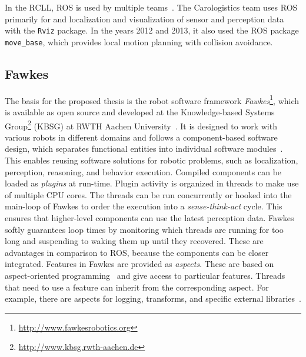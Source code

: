 In the RCLL, ROS is used by multiple teams~\cite{rc-2014}. The
Carologistics team uses ROS primarily for and localization and
visualization of sensor and perception data with the \texttt{Rviz}
package. In the years 2012 and 2013, it also used the ROS package
\texttt{move\_base}, which provides local motion planning with
collision avoidance.

\subsection{Fawkes}
\label{sec:fawkes}
The basis for the proposed thesis is the robot software framework
\emph{Fawkes}\footnote{\url{http://www.fawkesrobotics.org}}, which is
available as open source and developed at the Knowledge-based Systems
Group\footnote{\url{http://www.kbsg.rwth-aachen.de}} (KBSG) at RWTH
Aachen University~\cite{FawkesDesign,Fawkes-RCLL-2014}.  It is
designed to work with various robots in different domains and follows
a component-based software design, which separates functional entities
into individual software modules~\cite{component}. This enables
reusing software solutions for robotic problems, such as localization,
perception, reasoning, and behavior execution. Compiled components can
be loaded as \emph{plugins} at run-time.
%
Plugin activity is organized in threads to make use of multiple CPU
cores. The threads can be run concurrently or hooked into the
main-loop of Fawkes to order the execution into a
\emph{sense-think-act} cycle.  This ensures that higher-level
components can use the latest perception data.  Fawkes softly
guarantees loop times by monitoring which threads are running for too
long and suspending to waking them up until they recovered. These are advantages in comparison to ROS,
because the components can be closer integrated. Features in Fawkes
are provided as \emph{aspects}. These are based on aspect-oriented
programming~\cite{aspect_oriented} and give access to particular
features. Threads that need to use a feature can inherit from the
corresponding aspect. For example, there are aspects for logging,
transforms, and specific external libraries~\cite{tnthesis}.

